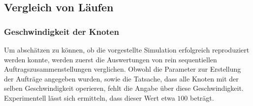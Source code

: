 \subsection{Vergleich von Läufen}
\label{vergleich}
\subsubsection{Geschwindigkeit der Knoten}
Um abschätzen zu können, ob die vorgestellte Simulation erfolgreich reproduziert werden konnte, werden zuerst die Auswertungen von rein sequentiellen Auftragszusammenstellungen verglichen. Obwohl die Parameter zur Erstellung der Aufträge angegeben wurden, sowie die Tatsache, dass alle Knoten mit der selben Geschwindigkeit operieren, fehlt die Angabe über diese Geschwindigkeit. Experimentell lässt sich ermitteln, dass dieser Wert etwa $100$ beträgt.

